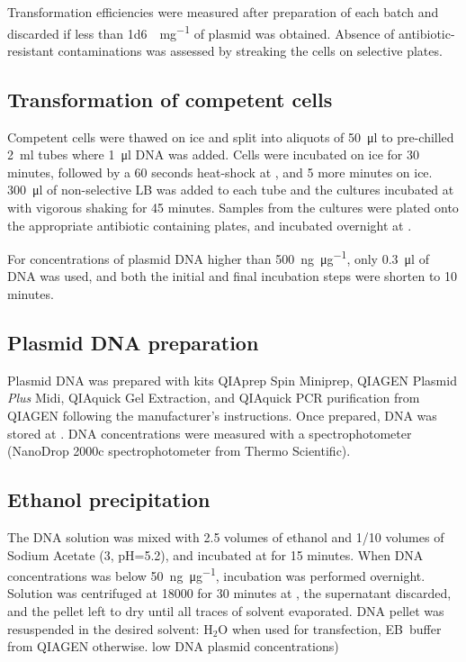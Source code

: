      Transformation efficiencies were measured after preparation of each
      batch and discarded if less than \SI{1d6}{\cfu\per\mg} of plasmid was
      obtained. Absence of antibiotic-resistant contaminations was assessed
      by streaking the cells on selective plates.

    \subsection{Transformation of competent cells}
      Competent cells were thawed on ice and split into aliquots of
      \SI{50}{\ul} to pre-chilled \SI{2}{\ml} tubes where \SI{1}{\ul} DNA
      was added. Cells were incubated on ice for 30 minutes, followed by a
      60 seconds heat-shock at , and 5 more minutes on ice.
      \SI{300}{\ul} of non-selective LB was added to each tube and the
      cultures incubated at  with vigorous shaking for 45 minutes.
      Samples from the cultures were plated onto the appropriate
      antibiotic containing plates, and incubated overnight at .

      For concentrations of plasmid DNA higher than \SI{500}{\ng\per\ug}, only
      \SI{0.3}{\ul} of DNA was used, and both the initial and final incubation
      steps were shorten to 10 minutes.

    \subsection{Plasmid DNA preparation}
      Plasmid DNA was prepared with kits QIAprep Spin Miniprep,
      QIAGEN Plasmid \textit{Plus} Midi, QIAquick Gel Extraction, and QIAquick
      PCR purification from QIAGEN following the manufacturer's instructions.
      Once prepared, DNA was stored at . DNA concentrations were measured
      with a spectrophotometer (NanoDrop 2000c spectrophotometer from
      Thermo Scientific).

    \subsection{Ethanol precipitation}
      \label{sec:ethanol-precipitation}
      The DNA solution was mixed with \num{2.5} volumes of  ethanol
      and \num{1/10} volumes of Sodium Acetate (\SI{3}{\Molar}, pH=\num{5.2}),
      and incubated at  for 15 minutes. When DNA concentrations was below
      \SI{50}{\ng\per\ug}, incubation was performed overnight.
      Solution was centrifuged at
      \SI{18000}{\gn} for 30 minutes at , the supernatant discarded, and
      the pellet left to dry until all traces of solvent evaporated. DNA pellet
      was resuspended in the desired solvent: H$_2$O when used for transfection,
      EB~buffer from QIAGEN otherwise.
      low DNA plasmid concentrations)

